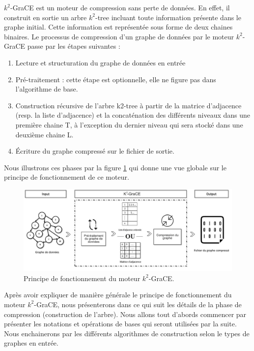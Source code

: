 \documentclass[a4paper,oneside,12pt]{report}
\theoremstyle{definition}
\begin{document}
	
$k^2$-GraCE est un moteur de compression sans perte de données. En effet, il construit en sortie un arbre $k^2$-tree incluant toute information présente dans le graphe initial. Cette information est représentée sous forme de deux chaines binaires. Le processus de compression d'un graphe de données par le moteur $k^2$-GraCE passe par les étapes suivantes :
\begin{enumerate}
\item Lecture et structuration du graphe de données en entrée 
\item Pré-traitement : cette étape est optionnelle, elle ne figure pas dans l'algorithme de base. 
\item Construction récursive de l'arbre k2-tree à partir de la matrice d'adjacence (resp. la liste d'adjacence) et la concaténation des différents niveaux dans une première chaine T, à l'exception du dernier niveau qui sera stocké dans une deuxième chaine L.

\item Écriture du graphe compressé sur le fichier de sortie.
\end{enumerate}

Nous illustrons ces phases par la figure \ref{k2grace} qui donne une vue globale sur le principe de fonctionnement de ce moteur.


\begin{figure}[H]
\includegraphics[scale=0.48]{./ressources/image/ograce.jpg}
\caption[Principe de fonctionnement du moteur $k^2$-GraCE]{Principe de fonctionnement du moteur $k^2$-GraCE.}
			\label{k2grace}
\end{figure}
Après avoir expliquer de manière générale le principe de fonctionnement du moteur $k^2$-GraCE, nous présenterons dans ce qui suit les détails de la phase de compression (construction de l'arbre). Nous allons tout d'abords commencer par présenter les notations et opérations de bases qui seront utilisées par la suite. Nous enchainerons par les différents algorithmes de construction selon le types de graphes en entrée.
		
\end{document}

